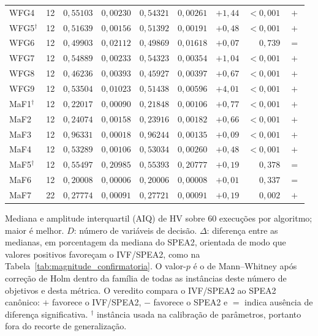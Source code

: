 \begin{table}[!htb]
\begin{tabular*}{\textwidth}{@{\extracolsep{\fill}}lrrrrrrrc@{}}
        WFG4 & 12 & $0{,}55103$ & $0{,}00230$ & $0{,}54321$ & $0{,}00261$ & $+1{,}44$ & $<0{,}001$ & $+$ \\
        WFG5$^{\dagger}$ & 12 & $0{,}51639$ & $0{,}00156$ & $0{,}51392$ & $0{,}00191$ & $+0{,}48$ & $<0{,}001$ & $+$ \\
        WFG6 & 12 & $0{,}49903$ & $0{,}02112$ & $0{,}49869$ & $0{,}01618$ & $+0{,}07$ & $0{,}739$ & $=$ \\
        WFG7 & 12 & $0{,}54889$ & $0{,}00233$ & $0{,}54323$ & $0{,}00354$ & $+1{,}04$ & $<0{,}001$ & $+$ \\
        WFG8 & 12 & $0{,}46236$ & $0{,}00393$ & $0{,}45927$ & $0{,}00397$ & $+0{,}67$ & $<0{,}001$ & $+$ \\
        WFG9 & 12 & $0{,}53504$ & $0{,}01023$ & $0{,}51438$ & $0{,}00596$ & $+4{,}01$ & $<0{,}001$ & $+$ \\
        \addlinespace
        MaF1$^{\dagger}$ & 12 & $0{,}22017$ & $0{,}00090$ & $0{,}21848$ & $0{,}00106$ & $+0{,}77$ & $<0{,}001$ & $+$ \\
        MaF2 & 12 & $0{,}24074$ & $0{,}00158$ & $0{,}23916$ & $0{,}00182$ & $+0{,}66$ & $<0{,}001$ & $+$ \\
        MaF3 & 12 & $0{,}96331$ & $0{,}00018$ & $0{,}96244$ & $0{,}00135$ & $+0{,}09$ & $<0{,}001$ & $+$ \\
        MaF4 & 12 & $0{,}53289$ & $0{,}00106$ & $0{,}53034$ & $0{,}00260$ & $+0{,}48$ & $<0{,}001$ & $+$ \\
        MaF5$^{\dagger}$ & 12 & $0{,}55497$ & $0{,}20985$ & $0{,}55393$ & $0{,}20777$ & $+0{,}19$ & $0{,}378$ & $=$ \\
        MaF6 & 12 & $0{,}20008$ & $0{,}00006$ & $0{,}20006$ & $0{,}00008$ & $+0{,}01$ & $0{,}337$ & $=$ \\
        MaF7 & 22 & $0{,}27774$ & $0{,}00091$ & $0{,}27721$ & $0{,}00091$ & $+0{,}19$ & $0{,}002$ & $+$ \\
        \bottomrule
    \end{tabular*}
    \par\smallskip
    \parbox{\textwidth}{\footnotesize
    Mediana e amplitude interquartil (AIQ) de HV sobre 60 execuções por algoritmo; maior é melhor. $D$: número de variáveis de decisão. $\Delta$: diferença entre as medianas, em porcentagem da mediana do SPEA2, orientada de modo que valores positivos favoreçam o IVF/SPEA2, como na Tabela~\ref{tab:magnitude_confirmatoria}. O valor-$p$ é o de Mann--Whitney após correção de Holm dentro da família de todas as instâncias deste número de objetivos e desta métrica. O veredito compara o IVF/SPEA2 ao SPEA2 canônico: $+$ favorece o IVF/SPEA2, $-$ favorece o SPEA2 e $=$ indica ausência de diferença significativa. $^{\dagger}$ instância usada na calibração de parâmetros, portanto fora do recorte de generalização.
    }
\end{table}
